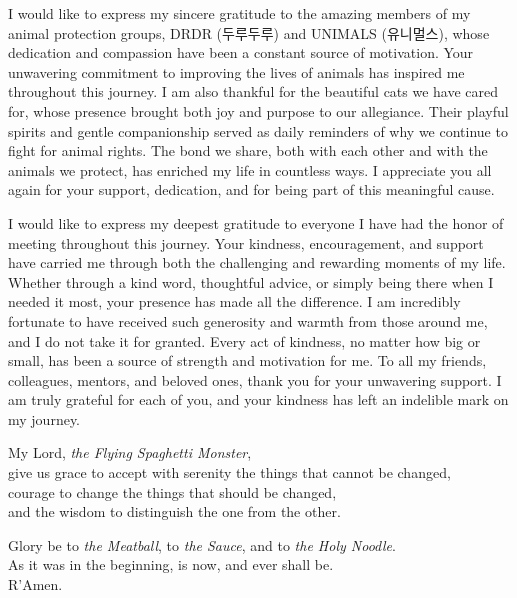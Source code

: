 \documentclass[11pt, a4paper, onecolumn, oneside]{report}
\begin{document}
        I would like to express my sincere gratitude to the amazing members of my animal protection groups, DRDR (두루두루) and UNIMALS (유니멀스), whose dedication and compassion have been a constant source of motivation. Your unwavering commitment to improving the lives of animals has inspired me throughout this journey. I am also thankful for the beautiful cats we have cared for, whose presence brought both joy and purpose to our allegiance. Their playful spirits and gentle companionship served as daily reminders of why we continue to fight for animal rights. The bond we share, both with each other and with the animals we protect, has enriched my life in countless ways. I appreciate you all again for your support, dedication, and for being part of this meaningful cause.

        I would like to express my deepest gratitude to everyone I have had the honor of meeting throughout this journey. Your kindness, encouragement, and support have carried me through both the challenging and rewarding moments of my life. Whether through a kind word, thoughtful advice, or simply being there when I needed it most, your presence has made all the difference. I am incredibly fortunate to have received such generosity and warmth from those around me, and I do not take it for granted. Every act of kindness, no matter how big or small, has been a source of strength and motivation for me. To all my friends, colleagues, mentors, and beloved ones, thank you for your unwavering support. I am truly grateful for each of you, and your kindness has left an indelible mark on my journey.

        \begin{center}
            My Lord, \textit{the Flying Spaghetti Monster},\\
            give us grace to accept with serenity the things that cannot be changed,\\
            courage to change the things that should be changed,\\
            and the wisdom to distinguish the one from the other.

            \medspace

            Glory be to \textit{the Meatball}, to \textit{the Sauce}, and to \textit{the Holy Noodle}. \\
            As it was in the beginning, is now, and ever shall be. \\
            R'Amen.
        \end{center}
    \clearpage

\hbox{ }
\thispagestyle{empty}
\clearpage
\end{document}
